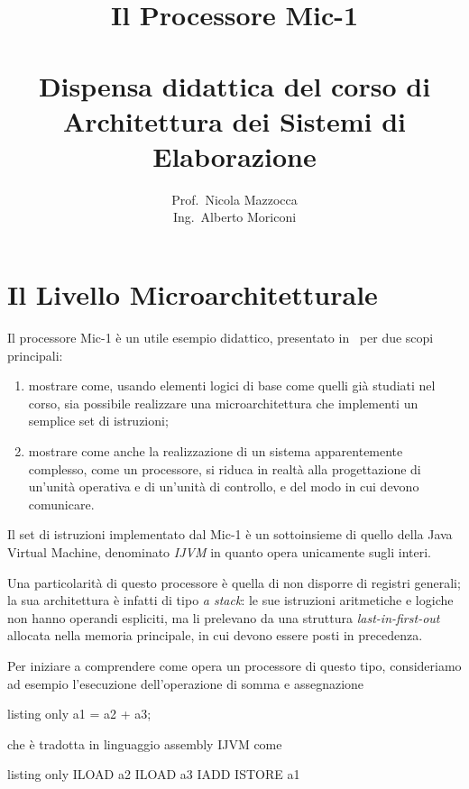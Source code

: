 \documentclass[a4paper,12pt]{scrreprt}
\title{Il Processore Mic-1 \\
  \ \\
  \large Dispensa didattica del corso di\\
  Architettura dei Sistemi di Elaborazione}
\author{Prof.\ Nicola Mazzocca \\
  Ing.\ Alberto Moriconi}
\date{}
\begin{document}
\maketitle

\chapter{Il Livello Microarchitetturale}

Il processore Mic-1 è un utile esempio didattico, presentato in~\cite{tanenbaum}
per due scopi principali:
\begin{enumerate}
  \item mostrare come, usando elementi logici di base come quelli già studiati
  nel corso, sia possibile realizzare una microarchitettura che implementi un
  semplice set di istruzioni;
  \item mostrare come anche la realizzazione di un sistema apparentemente
  complesso, come un processore, si riduca in realtà alla progettazione di
  un'unità operativa e di un'unità di controllo, e del modo in cui devono
  comunicare.
\end{enumerate}

Il set di istruzioni implementato dal Mic-1 è un sottoinsieme di quello della
Java Virtual Machine, denominato \textit{IJVM} in quanto opera unicamente sugli
interi.

Una particolarità di questo processore è quella di non disporre di registri
generali; la sua architettura è infatti di tipo \textit{a stack}: le sue
istruzioni aritmetiche e logiche non hanno operandi espliciti, ma li prelevano
da una struttura \textit{last-in-first-out} allocata nella memoria principale,
in cui devono essere posti in precedenza.

\medskip

Per iniziare a comprendere come opera un processore di questo tipo, consideriamo
ad esempio l'esecuzione dell'operazione di somma e assegnazione

\begin{tcblisting}{listing only}
  a1 = a2 + a3;
\end{tcblisting}

che è tradotta in linguaggio assembly IJVM come

\begin{tcblisting}{listing only}
  ILOAD a2
  ILOAD a3
  IADD
  ISTORE a1
\end{tcblisting}
\end{document}
